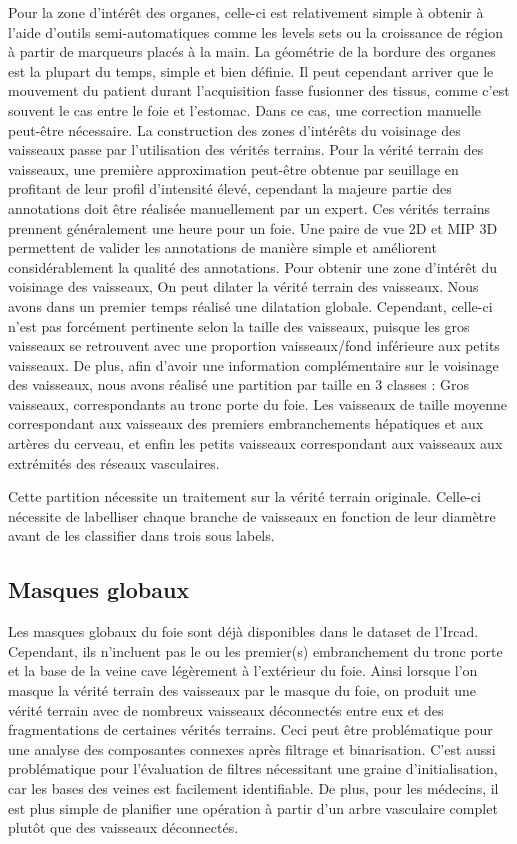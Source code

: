 Pour la zone d'intérêt des organes, celle-ci est relativement simple à obtenir à l'aide d'outils semi-automatiques comme les levels sets ou la croissance de région à partir de marqueurs placés à la main. La géométrie de la bordure des organes est la plupart du temps, simple et bien définie. Il peut cependant arriver que le mouvement du patient durant l'acquisition fasse fusionner des tissus, comme c'est souvent le cas entre le foie et l'estomac. Dans ce cas, une correction manuelle peut-être nécessaire.
La construction des zones d'intérêts du voisinage des vaisseaux passe par l'utilisation des vérités terrains.
Pour la vérité terrain des vaisseaux, une première approximation peut-être obtenue par seuillage en profitant de leur profil d'intensité élevé, cependant la majeure partie des annotations doit être réalisée manuellement par un expert. Ces vérités terrains prennent généralement une heure pour un foie. Une paire de vue 2D et MIP 3D permettent de valider les annotations de manière simple et améliorent considérablement la qualité des annotations.
Pour obtenir une zone d'intérêt du voisinage des vaisseaux, On peut dilater la vérité terrain des vaisseaux. Nous avons dans un premier temps réalisé une dilatation globale. Cependant, celle-ci n'est pas forcément pertinente selon la taille des vaisseaux, puisque les gros vaisseaux se retrouvent avec une proportion vaisseaux/fond inférieure aux petits vaisseaux. De plus, afin d'avoir une information complémentaire sur le voisinage des vaisseaux, nous avons réalisé une partition par taille en 3 classes : Gros vaisseaux, correspondants au tronc porte du foie. Les vaisseaux de taille moyenne correspondant aux vaisseaux des premiers embranchements hépatiques et aux artères du cerveau, et enfin les petits vaisseaux correspondant aux vaisseaux aux extrémités des réseaux vasculaires.

Cette partition nécessite un traitement sur la vérité terrain originale. Celle-ci nécessite de labelliser chaque branche de vaisseaux en fonction de leur diamètre avant de les classifier dans trois sous labels.

\subsection{Masques globaux}

Les masques globaux du foie sont déjà disponibles dans le dataset de l'Ircad. Cependant, ils n'incluent pas le ou les premier(s) embranchement du tronc porte et la base de la veine cave légèrement à l'extérieur du foie. Ainsi lorsque l'on masque la vérité terrain des vaisseaux par le masque du foie, on produit une vérité terrain avec de nombreux vaisseaux déconnectés entre eux et des fragmentations de certaines vérités terrains. Ceci peut être problématique pour une analyse des composantes connexes après filtrage et binarisation. C'est aussi problématique pour l'évaluation de filtres nécessitant une graine d'initialisation, car les bases des veines est facilement identifiable. De plus, pour les médecins, il est plus simple de planifier une opération à partir d'un arbre vasculaire complet plutôt que des vaisseaux déconnectés.

